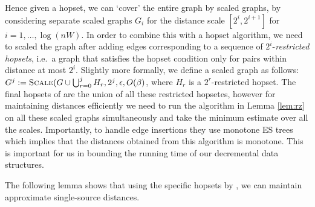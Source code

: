 \documentclass[11pt]{article}
\newtheorem{corollary}[theorem]{Corollary}
\newtheorem{lemma}[theorem]{Lemma}
\theoremstyle{definition}
\theoremstyle{remark}
\begin{document}
\begin{titlepage}
Hence given a hopset, we can `cover' the entire graph by scaled graphs, by considering separate scaled graphs $G_i$ for the distance scale $[2^i, 2^{i+1}]$ for $i=1,\dots, \log(nW)$. In order to combine this with a hopset algorithm, we need to scaled the graph after adding edges corresponding to a sequence of $2^i$-\textit{restricted hopsets}, i.e.~a graph that satisfies the hopset condition only for pairs within distance at most $2^i$. Slightly more formally, we define a scaled graph
as follows: $G^j := \textsc{Scale}(G \cup \bigcup_{r=0}^{j} H_{r}, 2^j, \epsilon, O(\beta)$, where $H_{r}$ is a $2^r$-restricted hopset. The final hopsets of \cite{LN2020} are the union of all these restricted hopsetes, however for maintaining distances efficiently we need to run the algorithm in Lemma \ref{lem:rz} on all these scaled graphs simultaneously and take the minimum estimate over all the scales. Importantly, to handle edge insertions they use monotone ES trees which implies that the distances obtained from this algorithm is monotone. This is important for us in bounding the running time of our decremental data structures.


The following lemma shows that using the specific hopsets by \cite{LN2020}, we can maintain approximate single-source distances. 




\end{titlepage}
\end{document}
